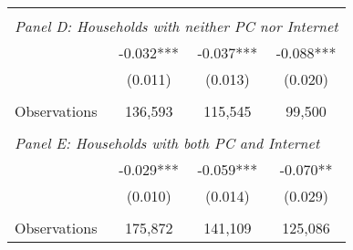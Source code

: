 {\begin{tabular}{lccc}
&  &  &   \\
\multicolumn{4}{l}{\textit{Panel D: Households with neither PC nor Internet}} \\
\hspace{3mm}        &      -0.032***&      -0.037***&      -0.088***\\
                    &     (0.011)   &     (0.013)   &     (0.020)   \\
                    &               &               &               \\
\hspace{3mm}Observations&     136,593   &     115,545   &      99,500   \\
 
&  &  &   \\
\multicolumn{4}{l}{\textit{Panel E: Households with both PC and Internet}} \\
\hspace{3mm}        &      -0.029***&      -0.059***&      -0.070** \\
                    &     (0.010)   &     (0.014)   &     (0.029)   \\
                    &               &               &               \\
\hspace{3mm}Observations&     175,872   &     141,109   &     125,086   \\
 

\bottomrule
\end{tabular}
}
